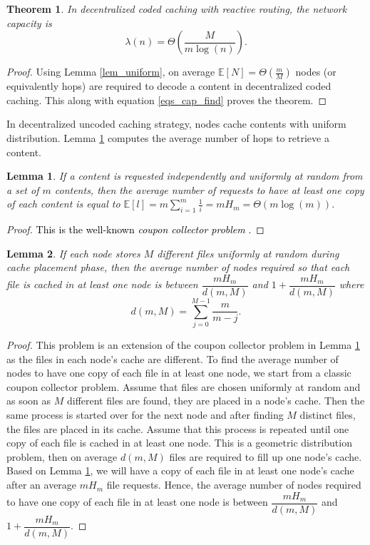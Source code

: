 \documentclass[10pt,journal]{IEEEtran}
\newtheorem{lem}{Lemma}
\newtheorem{thm}{Theorem}
\begin{document}
\begin{thm}{\em 
In decentralized coded caching with reactive routing, the network capacity is
 \begin{equation}
  \lambda(n) =   \Theta \left( \frac{M}{m \log(n)} \right).
 \label{cap_no_knowledge}
 \end{equation}
 }\label{thm_coded}
\end{thm}
\begin{proof}
Using Lemma \ref{lem_uniform}, on 
average $\mathbb{E}[N] = \Theta(\frac{m}{M})$ nodes (or equivalently hops) are required to decode a content in decentralized coded caching. This along with equation \eqref{eqs_cap_find} proves the theorem.
\end{proof}
In decentralized uncoded caching strategy, nodes cache contents with uniform distribution. Lemma \ref{leme0} computes the average number of hops to retrieve a content.
\begin{lem}
 {\em  If a content is requested independently and uniformly at random from a set of $m$ contents, then the average  number of requests to have at least one copy of each content is equal to $ \mathbb{E}[l] =  m \sum_{i=1}^{m} \frac{1}{i} = m H_{m} = \Theta(m \log(m))$. 
 }
 \label{leme0}
\end{lem}
\begin{proof}
\textcolor{black}{This is the well-known {\em coupon collector problem} \cite{erdHos1961classical}.}
\end{proof}
\begin{lem}{\em
 If each node stores $M$ different files uniformly at random during cache placement phase, then the average number of nodes required so that each file is cached in at least one node is between $\dfrac{m H_m}{d(m,M)}$ and $1+\dfrac{m H_m}{d(m,M)}$ where 
  \begin{equation}
  d(m,M) = \sum_{j=0}^{M-1} \frac{m}{m-j}.
  \label{eq_lem_batch}
 \end{equation}
 }\label{lem_batch}
\end{lem}
\begin{proof}
 This problem is an extension of the coupon collector problem in Lemma \ref{leme0} as the files in each node's cache are different. To find the average number of nodes to have one copy of each file in at least one node, we start from a classic coupon collector problem. Assume that files are chosen uniformly at random and as soon as $M$ different files are found, they are placed in a node's cache. Then the same process is  started over for the next node and after finding $M$ distinct files, the files are placed in its cache. Assume that this process is repeated until  one copy of each file is cached in at least one node. This is a geometric distribution problem, then on average $d(m,M)$ files are required to fill up one node's cache. Based on Lemma \ref{leme0},   we will have a copy of each file in at least one node's cache after an average $m H_m$ file requests. Hence, the average number of nodes required to have one copy of each file in at least one node is between $\dfrac{m H_m}{d(m,M)}$ and $1+\dfrac{m H_m}{d(m,M)}$. 
\end{proof}
\end{document}

